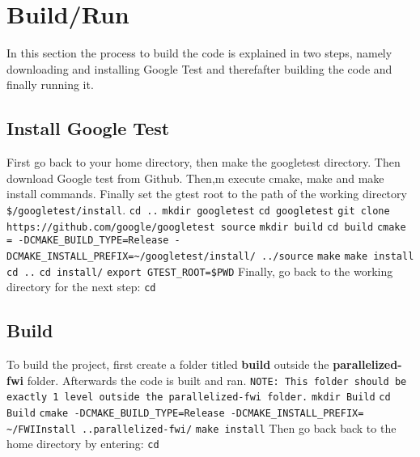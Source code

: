 \documentclass[10pt]{article}
\begin{document}
\section{Build/Run}
In this section the process to build the code is explained in two steps, namely downloading and installing Google Test and therefafter building the code and finally running it.  


\subsection{Install Google Test}
First go back to your home directory, then make the googletest directory. Then download Google test from Github. Then,m execute  cmake, make and make install commands. Finally set the gtest root to the path of the working directory \texttt{\$/googletest/install}.
\newline
\texttt{cd ..}
\newline
\texttt{mkdir googletest}
\newline
\texttt{cd googletest}
\newline
\texttt{git clone https://github.com/google/googletest source}
\newline
\texttt{mkdir build}
\newline
\texttt{cd build}
\newline
\texttt{cmake = -DCMAKE\_BUILD\_TYPE=Release -DCMAKE\_INSTALL\_PREFIX=\textasciitilde/googletest/install/ ../source}
\newline
\texttt{make}
\newline
\texttt{make install}
\newline
\texttt{cd ..}
\newline
\texttt{cd install/}
\newline
\texttt{export GTEST\_ROOT=\$PWD}
\newline
Finally, go back to the working directory for the next step:
\newline
\texttt{cd}
\subsection{Build}
To build the project, first create a folder titled \textbf{build} outside the \textbf{parallelized-fwi} folder. Afterwards the code is built and ran. 
\newline
\texttt{NOTE: This folder should be exactly 1 level outside the parallelized-fwi folder.}
\newline
\texttt{mkdir Build}
\newline
\texttt{cd Build}
\newline
\texttt{cmake -DCMAKE\_BUILD\_TYPE=Release -DCMAKE\_INSTALL\_PREFIX= \textasciitilde/FWIInstall ..parallelized-fwi/}
\newline
\texttt{make install} 
\newline
Then go back back to the home directory by entering:
\newline
\texttt{cd}
\end{document}
